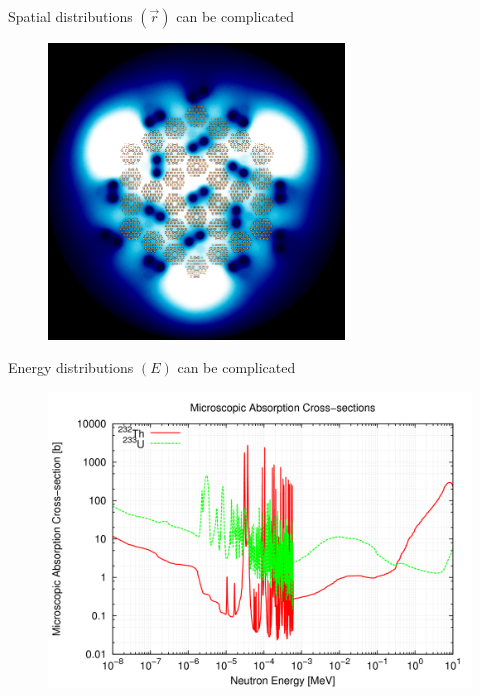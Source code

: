 \documentclass{beamer}
\begin{document}
        \begin{frame}{Spatial distributions $(\vec r)$ can be complicated}
            \begin{figure}
                \centering
                \includegraphics[width=0.7\textwidth]{./img/spaceFlux3.png}
                \caption*{}
            \end{figure}
        \end{frame}

        \begin{frame}{Energy distributions $(E)$ can be complicated}
            \begin{figure}
                \centering
                \includegraphics[width=1.0\textwidth]{./img/energyXs.png}
                \caption*{}
            \end{figure}
        \end{frame}
\end{document}

